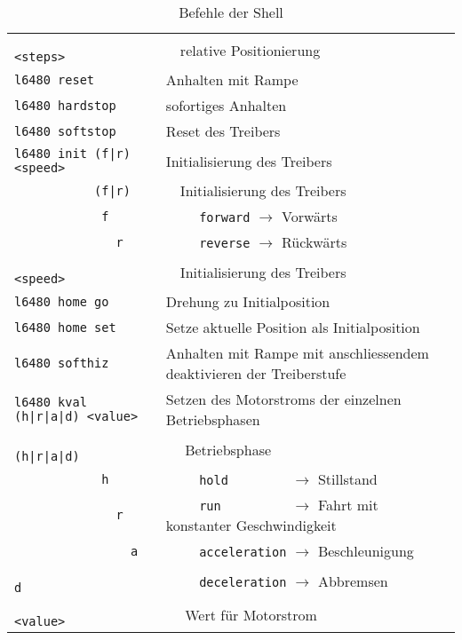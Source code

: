\begin{table}[h!]
\begin{tabular}{p{}p{}}
            \rowcolor{white} \verb?                 <steps>    ? & $\quad$relative Positionierung \\
            \rowcolor{lgray} \verb?l6480 reset                 ? & Anhalten mit Rampe \\
            \rowcolor{white} \verb?l6480 hardstop              ? & sofortiges Anhalten \\
            \rowcolor{lgray} \verb?l6480 softstop              ? & Reset des Treibers \\
            \rowcolor{white} \verb?l6480 init (f|r) <speed>    ? & Initialisierung des Treibers \\
            \rowcolor{white} \verb?           (f|r)            ? & $\quad$Initialisierung des Treibers \\
            \rowcolor{white} \verb?            f               ?      & $\quad\quad$ \verb?forward? $\to$ Vorwärts \\
            \rowcolor{white} \verb?              r             ?      & $\quad\quad$ \verb?reverse? $\to$ Rückwärts \\
            \rowcolor{white} \verb?                 <speed>    ? & $\quad$Initialisierung des Treibers \\
            \rowcolor{lgray} \verb?l6480 home go               ? & Drehung zu Initialposition \\
            \rowcolor{white} \verb?l6480 home set              ? & Setze aktuelle Position als Initialposition \\
            \rowcolor{lgray} \verb?l6480 softhiz               ? & Anhalten mit Rampe mit anschliessendem deaktivieren der Treiberstufe \\
            \rowcolor{white} \verb?l6480 kval (h|r|a|d) <value>? & Setzen des Motorstroms der einzelnen Betriebsphasen \\
            \rowcolor{white} \verb?           (h|r|a|d)        ? & $\quad$ Betriebsphase \\
            \rowcolor{white} \verb?            h               ? & $\quad\quad$ \verb?hold        ? $\to$ Stillstand \\
            \rowcolor{white} \verb?              r             ? & $\quad\quad$ \verb?run         ? $\to$ Fahrt mit konstanter Geschwindigkeit \\
            \rowcolor{white} \verb?                a           ? & $\quad\quad$ \verb?acceleration? $\to$ Beschleunigung \\
            \rowcolor{white} \verb?                  d         ? & $\quad\quad$ \verb?deceleration? $\to$ Abbremsen \\
            \rowcolor{white} \verb?                     <value>? & $\quad$ Wert für Motorstrom \\
        \end{tabular}
        \caption{Befehle der Shell}
        \label{tab:shell_parser}
    \end{table}

